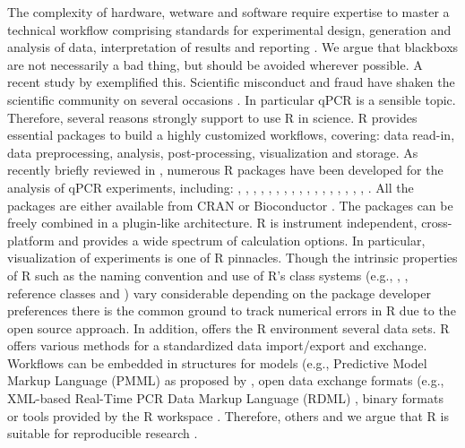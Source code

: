 The complexity of hardware, wetware and software require expertise to master a 
technical workflow comprising standards for experimental design, generation and 
analysis of data, interpretation of results and reporting 
\citep{huggett_BDQ_2014}. We argue that blackboxs are not necessarily a bad 
thing, but should be avoided wherever possible. A recent study by 
\citet{Duran_2014} exemplified this. Scientific misconduct and fraud have shaken 
the scientific community on several occasions \citep{mccullough_2008, fang_2012}. In particular 
qPCR is a sensible topic. Therefore, several reasons strongly support to use R 
in science. R provides essential packages to build a highly customized 
workflows, covering: data read-in, data preprocessing, analysis, 
post-processing, visualization and storage. As recently briefly reviewed in 
\citet{pabinger_2014}, numerous R packages have been developed for the analysis 
of qPCR experiments, including: , , 
, , , , 
, , , , 
, , , , 
, , , 
. All the packages are either available from CRAN or 
Bioconductor \citep{gentleman_2004}. The packages can be freely combined in a 
plugin-like architecture. R is instrument independent, cross-platform and 
provides a wide spectrum of calculation options. In particular, visualization of 
experiments is one of R pinnacles. Though the intrinsic properties of R such as 
the naming convention \citep{Baaaath_2012} and use of R's class systems (e.g., 
, , reference classes and ) vary considerable 
depending on the package developer preferences there is the common ground to 
track numerical errors in R due to the open source approach. In addition, offers 
the R environment several data sets. R offers various methods for a standardized 
data import/export and exchange. Workflows can be embedded in structures for 
models (e.g., Predictive Model Markup Language (PMML) as proposed by 
\citet{Guazzelli_2009}, open data exchange formats (e.g., XML-based Real-Time 
PCR Data Markup Language (RDML) \citep{lefever_2009}, binary formats 
\citep{michna_2013} or tools provided by the R workspace \citep{RDCT2010c}. 
Therefore, others and we argue that R is suitable for reproducible research 
\citep{Gesmann_2011, Murrell_2012, gandrud_2013, hofmann_2013, Leeper_2014, 
liu_2014}.

